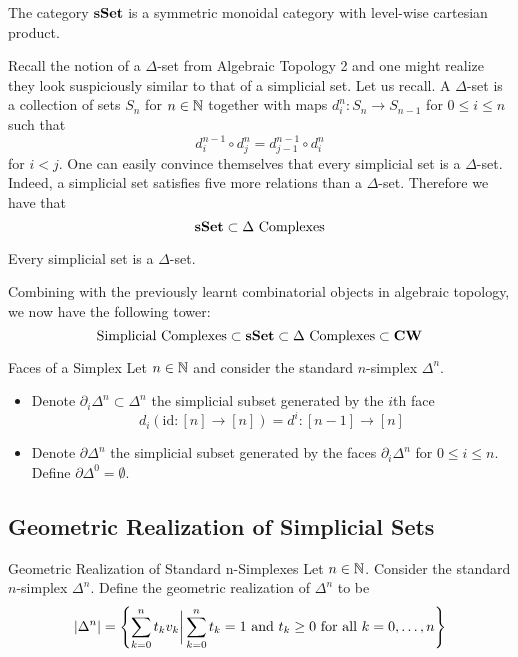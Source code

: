 \documentclass[a4paper]{article}
\begin{document}
\begin{thm}{}{} The category $\bold{sSet}$ is a symmetric monoidal category with level-wise cartesian product. 
\end{thm}

Recall the notion of a $\Delta$-set from Algebraic Topology 2 and one might realize they look suspiciously similar to that of a simplicial set. Let us recall. A $\Delta$-set is a collection of sets $S_n$ for $n\in\mathbb{N}$ together with maps $d_i^n:S_n\to S_{n-1}$ for $0\leq i\leq n$ such that $$d_i^{n-1}\circ d_j^n=d_{j-1}^{n-1}\circ d_i^n$$ for $i<j$. One can easily convince themselves that every simplicial set is a $\Delta$-set. Indeed, a simplicial set satisfies five more relations than a $\Delta$-set. Therefore we have that $$\bold{sSet}\subset\Delta\text{ Complexes}$$

\begin{thm}{}{} Every simplicial set is a $\Delta$-set. 
\end{thm}

Combining with the previously learnt combinatorial objects in algebraic topology, we now have the following tower:  $$\text{Simplicial Complexes}\subset\bold{sSet}\subset\Delta\text{ Complexes}\subset\bold{CW}$$

\begin{defn}{Faces of a Simplex}{} Let $n\in\mathbb{N}$ and consider the standard $n$-simplex $\Delta^n$. 
\begin{itemize}
\item Denote $\partial_i\Delta^n\subset\Delta^n$ the simplicial subset generated by the $i$th face $$d_i(\text{id}:[n]\to[n])=d^i:[n-1]\to[n]$$
\item Denote $\partial\Delta^n$ the simplicial subset generated by the faces $\partial_i\Delta^n$ for $0\leq i\leq n$. Define $\partial\Delta^0=\emptyset$. 
\end{itemize}
\end{defn}

\subsection{Geometric Realization of Simplicial Sets}
\begin{defn}{Geometric Realization of Standard n-Simplexes}{} Let $n\in\mathbb{N}$. Consider the standard $n$-simplex $\Delta^n$. Define the geometric realization of $\Delta^n$ to be $$\abs{\Delta^n}=\left\{\sum_{k=0}^nt_kv_k\bigg{|}\sum_{k=0}^nt_k=1\text{ and }t_k\geq 0\text{ for all }k=0,\dots,n\right\}$$
\end{defn}
\end{document}
